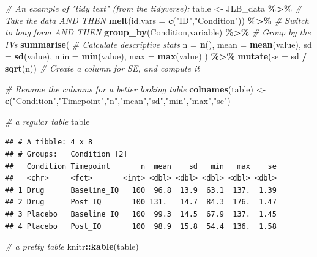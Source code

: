 \documentclass[
]{book}
\newenvironment{Shaded}{\begin{snugshade}}{\end{snugshade}}
\newcommand{\AttributeTok}[1]{\textcolor[rgb]{0.13,0.29,0.53}{#1}}
\newcommand{\CommentTok}[1]{\textcolor[rgb]{0.56,0.35,0.01}{\textit{#1}}}
\newcommand{\FunctionTok}[1]{\textcolor[rgb]{0.13,0.29,0.53}{\textbf{#1}}}
\newcommand{\NormalTok}[1]{#1}
\newcommand{\OtherTok}[1]{\textcolor[rgb]{0.56,0.35,0.01}{#1}}
\newcommand{\SpecialCharTok}[1]{\textcolor[rgb]{0.81,0.36,0.00}{\textbf{#1}}}
\newcommand{\StringTok}[1]{\textcolor[rgb]{0.31,0.60,0.02}{#1}}
\begin{document}
\begin{Shaded}
\begin{Highlighting}[]
\CommentTok{\# An example of "tidy text" (from the tidyverse):}
\NormalTok{table }\OtherTok{\textless{}{-}}\NormalTok{ JLB\_data }\SpecialCharTok{\%\textgreater{}\%} \CommentTok{\# Take the data AND THEN}
  \FunctionTok{melt}\NormalTok{(}\AttributeTok{id.vars =} \FunctionTok{c}\NormalTok{(}\StringTok{"ID"}\NormalTok{,}\StringTok{"Condition"}\NormalTok{)) }\SpecialCharTok{\%\textgreater{}\%} \CommentTok{\# Switch to long form AND THEN}
  \FunctionTok{group\_by}\NormalTok{(Condition,variable) }\SpecialCharTok{\%\textgreater{}\%} \CommentTok{\# Group by the IVs}
  \FunctionTok{summarise}\NormalTok{( }\CommentTok{\# Calculate descriptive stats}
    \AttributeTok{n =} \FunctionTok{n}\NormalTok{(),}
    \AttributeTok{mean =} \FunctionTok{mean}\NormalTok{(value),}
    \AttributeTok{sd =} \FunctionTok{sd}\NormalTok{(value),}
    \AttributeTok{min =} \FunctionTok{min}\NormalTok{(value),}
    \AttributeTok{max =} \FunctionTok{max}\NormalTok{(value)}
\NormalTok{  ) }\SpecialCharTok{\%\textgreater{}\%} \FunctionTok{mutate}\NormalTok{(}\AttributeTok{se =}\NormalTok{ sd }\SpecialCharTok{/} \FunctionTok{sqrt}\NormalTok{(n)) }\CommentTok{\# Create a column for SE, and compute it}

\CommentTok{\# Rename the columns for a better looking table}
\FunctionTok{colnames}\NormalTok{(table) }\OtherTok{\textless{}{-}} \FunctionTok{c}\NormalTok{(}\StringTok{"Condition"}\NormalTok{,}\StringTok{"Timepoint"}\NormalTok{,}\StringTok{"n"}\NormalTok{,}\StringTok{"mean"}\NormalTok{,}\StringTok{"sd"}\NormalTok{,}\StringTok{"min"}\NormalTok{,}\StringTok{"max"}\NormalTok{,}\StringTok{"se"}\NormalTok{)}

\CommentTok{\# a regular table}
\NormalTok{table}
\end{Highlighting}
\end{Shaded}

\begin{verbatim}
## # A tibble: 4 x 8
## # Groups:   Condition [2]
##   Condition Timepoint       n  mean    sd   min   max    se
##   <chr>     <fct>       <int> <dbl> <dbl> <dbl> <dbl> <dbl>
## 1 Drug      Baseline_IQ   100  96.8  13.9  63.1  137.  1.39
## 2 Drug      Post_IQ       100 131.   14.7  84.3  176.  1.47
## 3 Placebo   Baseline_IQ   100  99.3  14.5  67.9  137.  1.45
## 4 Placebo   Post_IQ       100  98.9  15.8  54.4  136.  1.58
\end{verbatim}

\begin{Shaded}
\begin{Highlighting}[]
\CommentTok{\# a pretty table }
\NormalTok{knitr}\SpecialCharTok{::}\FunctionTok{kable}\NormalTok{(table)}
\end{Highlighting}
\end{Shaded}
\end{document}
